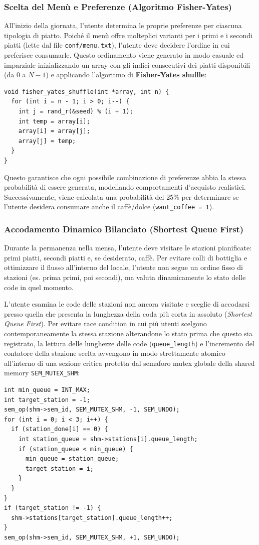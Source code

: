 \documentclass[a4paper,12pt]{article}
\begin{document}
\subsubsection{Scelta del Menù e Preferenze (Algoritmo Fisher-Yates)}
All'inizio della giornata, l'utente determina le proprie preferenze per ciascuna tipologia di piatto. Poiché il menù offre molteplici varianti per i primi e i secondi piatti (lette dal file \texttt{conf/menu.txt}), l'utente deve decidere l'ordine in cui preferisce consumarle. 
Questo ordinamento viene generato in modo casuale ed imparziale inizializzando un array con gli indici consecutivi dei piatti disponibili (da $0$ a $N-1$) e applicando l'algoritmo di \textbf{Fisher-Yates shuffle}:
\begin{lstlisting}[caption={Algoritmo di Fisher-Yates per la scelta dei piatti.}]
void fisher_yates_shuffle(int *array, int n) {
  for (int i = n - 1; i > 0; i--) {
    int j = rand_r(&seed) % (i + 1);
    int temp = array[i];
    array[i] = array[j];
    array[j] = temp;
  }
}
\end{lstlisting}
Questo garantisce che ogni possibile combinazione di preferenze abbia la stessa probabilità di essere generata, modellando comportamenti d'acquisto realistici. Successivamente, viene calcolata una probabilità del 25\% per determinare se l'utente desidera consumare anche il caffè/dolce (\texttt{want\_coffee = 1}).

\subsubsection{Accodamento Dinamico Bilanciato (Shortest Queue First)}
Durante la permanenza nella mensa, l'utente deve visitare le stazioni pianificate: primi piatti, secondi piatti e, se desiderato, caffè. Per evitare colli di bottiglia e ottimizzare il flusso all'interno del locale, l'utente non segue un ordine fisso di stazioni (es. prima primi, poi secondi), ma valuta dinamicamente lo stato delle code in quel momento.

L'utente esamina le code delle stazioni non ancora visitate e sceglie di accodarsi presso quella che presenta la lunghezza della coda più corta in assoluto (\textit{Shortest Queue First}). Per evitare race condition in cui più utenti scelgono contemporaneamente la stessa stazione alterandone lo stato prima che questo sia registrato, la lettura delle lunghezze delle code (\texttt{queue\_length}) e l'incremento del contatore della stazione scelta avvengono in modo strettamente atomico all'interno di una sezione critica protetta dal semaforo mutex globale della shared memory \texttt{SEM\_MUTEX\_SHM}:
\begin{lstlisting}[caption={Selezione della stazione con coda minore.}]
int min_queue = INT_MAX;
int target_station = -1;
sem_op(shm->sem_id, SEM_MUTEX_SHM, -1, SEM_UNDO);
for (int i = 0; i < 3; i++) {
  if (station_done[i] == 0) {
    int station_queue = shm->stations[i].queue_length;
    if (station_queue < min_queue) {
      min_queue = station_queue;
      target_station = i;
    }
  }
}
if (target_station != -1) {
  shm->stations[target_station].queue_length++;
}
sem_op(shm->sem_id, SEM_MUTEX_SHM, +1, SEM_UNDO);
\end{lstlisting}
\end{document}
